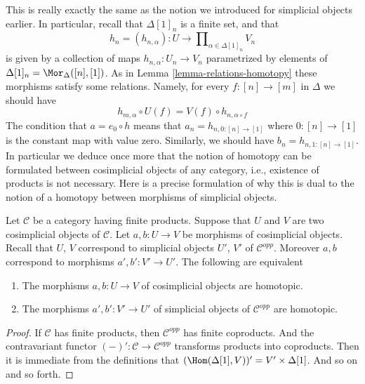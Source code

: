 \noindent
This is really exactly the same as the notion we introduced for simplicial
objects earlier. In particular, recall that $\Delta[1]_n$ is a finite
set, and that
$$
h_n = (h_{n, \alpha}) :
U
\longrightarrow
\prod\nolimits_{\alpha \in \Delta[1]_n} V_n
$$
is given by a collection of maps $h_{n, \alpha} : U_n \to V_n$ parametrized
by elements of $\Delta[1]_n = \Mor_\Delta([n], [1])$. As in
Lemma \ref{lemma-relations-homotopy}
these morphisms satisfy some relations. Namely, for every $f : [n] \to [m]$
in $\Delta$ we should have
\begin{equation}
\label{equation-property-homotopy-cosimplicial}
h_{m, \alpha} \circ U(f) = V(f) \circ h_{n, \alpha \circ f}
\end{equation}
The condition that $a = e_0 \circ h$ means that $a_n = h_{n, 0 : [n] \to [1]}$
where $0 : [n] \to [1]$ is the constant map with value zero. Similarly,
we should have $b_n = h_{n, 1 : [n] \to [1]}$.
In particular we deduce once more that the notion of homotopy can be
formulated between cosimplicial objects of any category, i.e., existence of
products is not necessary. Here is a precise formulation of why this is
dual to the notion of a homotopy between morphisms of simplicial objects.

\begin{lemma}
\label{lemma-compare-homotopies}
Let $\mathcal{C}$ be a category having finite products.
Suppose that $U$ and $V$ are two cosimplicial objects
of $\mathcal{C}$. Let $a, b : U \to V$ be morphisms
of cosimplicial objects. Recall that $U$, $V$ correspond
to simplicial objects $U'$, $V'$ of $\mathcal{C}^{opp}$.
Moreover $a, b$ correspond to morphisms $a', b' : V' \to U'$.
The following are equivalent
\begin{enumerate}
\item The morphisms $a, b : U \to V$ of cosimplicial
objects are homotopic.
\item The morphisms $a', b' : V' \to U'$ of simplicial objects
of $\mathcal{C}^{opp}$ are homotopic.
\end{enumerate}
\end{lemma}

\begin{proof}
If $\mathcal{C}$ has finite products, then
$\mathcal{C}^{opp}$ has finite coproducts.
And the contravariant functor $(-)' : \mathcal{C} \to \mathcal{C}^{opp}$
transforms products into coproducts.
Then it is immediate from the definitions
that $(\Hom(\Delta[1], V))' = V' \times \Delta[1]$.
And so on and so forth.
\end{proof}

